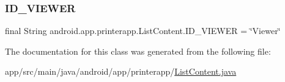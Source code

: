 \mbox{\label{classandroid_1_1app_1_1printerapp_1_1_list_content_abaddb86a7653f93885a0bb88f75de461}} 
\subsubsection{\texorpdfstring{I\+D\+\_\+\+V\+I\+E\+W\+ER}{ID\_VIEWER}}
{\footnotesize\ttfamily final String android.\+app.\+printerapp.\+List\+Content.\+I\+D\+\_\+\+V\+I\+E\+W\+ER = \char`\"{}Viewer\char`\"{}\hspace{0.3cm}{\ttfamily [static]}}



The documentation for this class was generated from the following file\+:\begin{DoxyCompactItemize}
\item 
app/src/main/java/android/app/printerapp/\hyperlink{_list_content_8java}{List\+Content.\+java}\end{DoxyCompactItemize}
